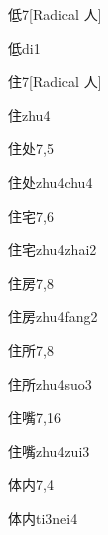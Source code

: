 \begin{entry}{低}{7}[Radical 人]
  \begin{phonetics}{低}{di1}
  \end{phonetics}
\end{entry}

\begin{entry}{住}{7}[Radical 人]
  \begin{phonetics}{住}{zhu4}
  \end{phonetics}
\end{entry}

\begin{entry}{住处}{7,5}
  \begin{phonetics}{住处}{zhu4chu4}
  \end{phonetics}
\end{entry}

\begin{entry}{住宅}{7,6}
  \begin{phonetics}{住宅}{zhu4zhai2}
  \end{phonetics}
\end{entry}

\begin{entry}{住房}{7,8}
  \begin{phonetics}{住房}{zhu4fang2}
  \end{phonetics}
\end{entry}

\begin{entry}{住所}{7,8}
  \begin{phonetics}{住所}{zhu4suo3}
  \end{phonetics}
\end{entry}

\begin{entry}{住嘴}{7,16}
  \begin{phonetics}{住嘴}{zhu4zui3}
  \end{phonetics}
\end{entry}

\begin{entry}{体内}{7,4}
  \begin{phonetics}{体内}{ti3nei4}
  \end{phonetics}
\end{entry}

